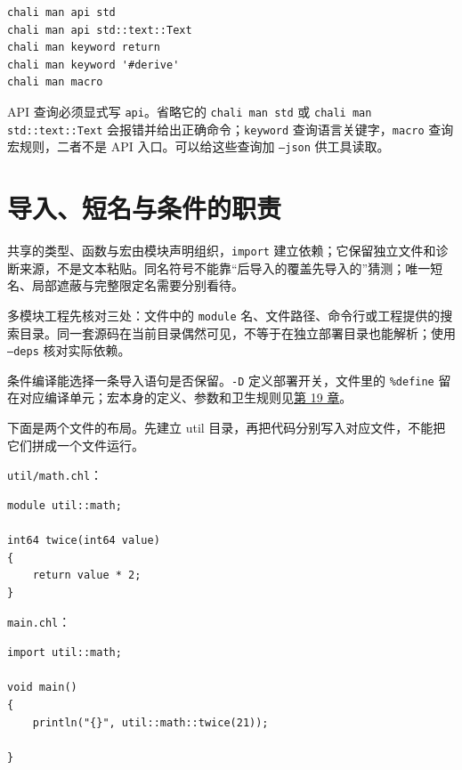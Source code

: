 \par
\medskip
\begin{lstlisting}[style=sh]
chali man api std
chali man api std::text::Text
chali man keyword return
chali man keyword '#derive'
chali man macro
\end{lstlisting}
\par
\medskip

API 查询必须显式写 \texttt{api}。省略它的 \texttt{chali man std} 或 \texttt{chali man std:\allowbreak{}:\allowbreak{}text:\allowbreak{}:\allowbreak{}Text} 会报错并给出正确命令；\texttt{keyword} 查询语言关键字，\texttt{macro} 查询宏规则，二者不是 API 入口。可以给这些查询加 \texttt{--json} 供工具读取。

\section{导入、短名与条件的职责}

共享的类型、函数与宏由模块声明组织，\texttt{import} 建立依赖；它保留独立文件和诊断来源，不是文本粘贴。同名符号不能靠“后导入的覆盖先导入的”猜测；唯一短名、局部遮蔽与完整限定名需要分别看待。

多模块工程先核对三处：文件中的 \texttt{module} 名、文件路径、命令行或工程提供的搜索目录。同一套源码在当前目录偶然可见，不等于在独立部署目录也能解析；使用 \texttt{--deps} 核对实际依赖。

条件编译能选择一条导入语句是否保留。\texttt{-D} 定义部署开关，文件里的 \texttt{\%define} 留在对应编译单元；宏本身的定义、参数和卫生规则见\hyperref[ch:19]{第 19 章}。

下面是两个文件的布局。先建立 util 目录，再把代码分别写入对应文件，不能把它们拼成一个文件运行。

\texttt{util/\allowbreak{}math.\allowbreak{}chl}：

\par
\medskip
\begin{lstlisting}[style=chali]
module util::math;

int64 twice(int64 value)
{
    return value * 2;
}
\end{lstlisting}
\par
\medskip

\texttt{main.\allowbreak{}chl}：

\par
\medskip
\begin{lstlisting}[style=chali]
import util::math;

void main()
{
    println("{}", util::math::twice(21));

}
\end{lstlisting}
\par
\medskip

